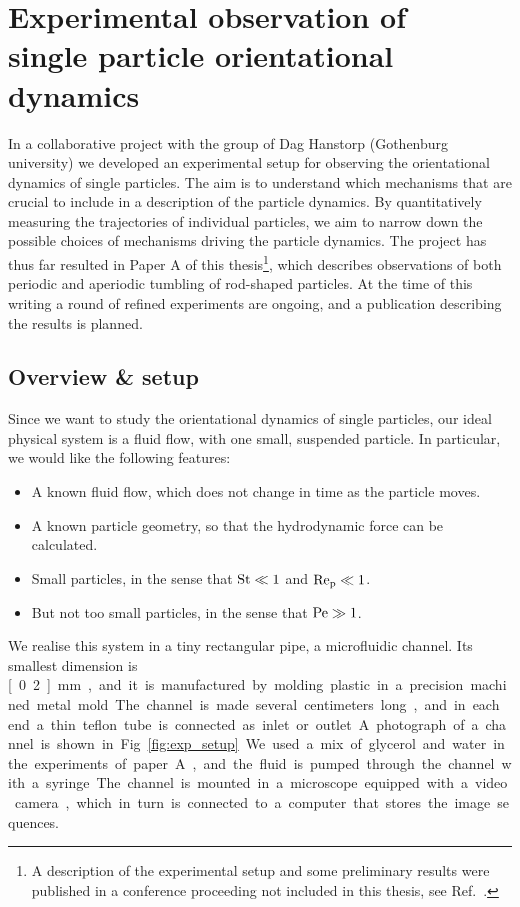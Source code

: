 \documentclass[thesis.tex]{subfiles}
\begin{document}
\chapter[Experimental observations]{Experimental observation of \\single particle orientational dynamics}\label{sec:experiment}

In a collaborative project with the group of Dag Hanstorp (Gothenburg university) we developed an experimental setup for observing the orientational dynamics of single particles. The aim is to understand which mechanisms that are crucial to include in a description of the particle dynamics. By quantitatively measuring the trajectories of individual particles, we aim to narrow down the possible choices of mechanisms driving the particle dynamics. The project has thus far resulted in Paper A of this thesis\footnote{A description of the experimental setup and some preliminary results were published in a conference proceeding not included in this thesis, see Ref.~\cite{mishra2012}.}, which describes observations of both periodic and aperiodic tumbling of rod-shaped particles. At the time of this writing a round of refined experiments are ongoing, and a publication describing the results is planned.

\section{Overview \& setup}

Since we want to study the orientational dynamics of single particles, our ideal physical system is a fluid flow, with one small, suspended particle. In particular, we would like the following features:
\begin{itemize}
	\item A known fluid flow, which does not change in time as the particle moves.
	\item A known particle geometry, so that the hydrodynamic force can be calculated.
	\item Small particles, in the sense that $\mbox{St}\ll1$ and $\mbox{Re}_{\mathrm p}\ll1$.
	\item But not too small particles, in the sense that $\mbox{Pe}\gg1$.
\end{itemize}
We realise this system in a tiny rectangular pipe, a microfluidic channel. Its smallest dimension is \unit[0.2]{mm}, and it is manufactured by molding plastic in a precision machined metal mold. The channel is made several centimeters long, and in each end a thin teflon tube is connected as inlet or outlet. A photograph of a channel is shown in Fig.~\ref{fig:exp_setup}. We used a mix of glycerol and water in the experiments of paper A, and the fluid is pumped through the channel with a syringe. The channel is mounted in a microscope equipped with a video camera, which in turn is connected to a computer that stores the image sequences.
\end{document}
